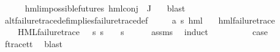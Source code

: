 \begin{isabellebody}
\ \ \ \ \isamarkupfalse%
\ {\isacartoucheopen}hml{\isacharunderscore}{\kern0pt}impossible{\isacharunderscore}{\kern0pt}futures\ {\isacharparenleft}{\kern0pt}hml{\isacharunderscore}{\kern0pt}conj\ {\isacharbraceleft}{\kern0pt}{\isacharbraceright}{\kern0pt}\ J\ {\isasymPsi}{\isacharparenright}{\kern0pt}{\isacartoucheclose}\ \isamarkupfalse%
\ blast\isanewline
{}\isamarkupfalse%
%
\endisatagproof
{\isafoldproof}%
%
\isadelimproof
\isanewline
%
\endisadelimproof
\isanewline
{}\isamarkupfalse%
\ alt{\isacharunderscore}{\kern0pt}failure{\isacharunderscore}{\kern0pt}trace{\isacharunderscore}{\kern0pt}def{\isacharunderscore}{\kern0pt}implies{\isacharunderscore}{\kern0pt}failure{\isacharunderscore}{\kern0pt}trace{\isacharunderscore}{\kern0pt}def{\isacharcolon}{\kern0pt}\isanewline
\ \ \ {\isasymphi}\ {\isacharcolon}{\kern0pt}{\isacharcolon}{\kern0pt}\ {\isachardoublequoteopen}{\isacharparenleft}{\kern0pt}{\isacharprime}{\kern0pt}a{\isacharcomma}{\kern0pt}\ {\isacharprime}{\kern0pt}s{\isacharparenright}{\kern0pt}\ hml{\isachardoublequoteclose}\isanewline
\ \ \ {\isachardoublequoteopen}hml{\isacharunderscore}{\kern0pt}failure{\isacharunderscore}{\kern0pt}trace\ {\isasymphi}{\isachardoublequoteclose}\isanewline
\ \ \ {\isachardoublequoteopen}{\isasymexists}{\isasympsi}{\isachardot}{\kern0pt}\ HML{\isacharunderscore}{\kern0pt}failure{\isacharunderscore}{\kern0pt}trace\ {\isasympsi}\ {\isasymand}\ {\isacharparenleft}{\kern0pt}{\isasymforall}s{\isachardot}{\kern0pt}\ {\isacharparenleft}{\kern0pt}s\ {\isasymTurnstile}\ {\isasymphi}{\isacharparenright}{\kern0pt}\ {\isasymlongleftrightarrow}\ {\isacharparenleft}{\kern0pt}s\ {\isasymTurnstile}\ {\isasympsi}{\isacharparenright}{\kern0pt}{\isacharparenright}{\kern0pt}{\isachardoublequoteclose}\isanewline
%
\isadelimproof
\ \ %
\endisadelimproof
%
\isatagproof
{}\isamarkupfalse%
\ assms\ \isamarkupfalse%
\ induct\isanewline
\ \ \isamarkupfalse%
\ {}\isanewline
\ \ \isamarkupfalse%
\ \isamarkupfalse%
\ {\isacharquery}{\kern0pt}case\isanewline
\ \ \ \ \isamarkupfalse%
\ f{\isacharunderscore}{\kern0pt}trace{\isacharunderscore}{\kern0pt}tt\ \isamarkupfalse%
\ blast\isanewline
{}\isamarkupfalse%
\isanewline
\ \ \isamarkupfalse%
\ {\isacharparenleft}{\kern0pt}{}\ {\isasymphi}\ {\isasymalpha}{\isacharparenright}{\kern0pt}\isanewline
\ \ \isamarkupfalse%

\end{isabellebody}
